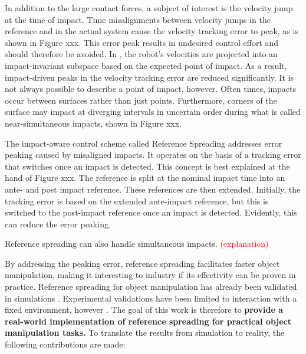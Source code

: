 \documentclass[a4paper, 10pt, conference]{ieeeconf}
\begin{document}
    In addition to the large contact forces, a subject of interest is the velocity jump at the time of impact. Time misalignments between velocity jumps in the reference and in the actual system cause the velocity tracking error to peak\cite{biemondTrackingControlMechanical2012}, as is shown in Figure xxx. This error peak results in undesired control effort and should therefore be avoided. In \cite{yangImpactInvariantControl2021}, the robot's velocities are projected into an impact-invariant subspace based on the expected point of impact. As a result, impact-driven peaks in the velocity tracking error are reduced significantly. It is not always possible to describe a point of impact, however. Often times, impacts occur between surfaces rather than just points. Furthermore, corners of the surface may impact at diverging intervals in uncertain order during what is called near-simultaneous impacts, shown in Figure xxx.

    The impact-aware control scheme called Reference Spreading \cite{sacconSensitivityAnalysisHybrid2014} addresses error peaking caused by misaligned impacts. It operates on the basis of a tracking error that switches once an impact is detected. This concept is best explained at the hand of Figure xxx. The reference is split at the nominal impact time into an ante- and post impact reference. These references are then extended. Initially, the tracking error is based on the extended ante-impact reference, but this is switched to the post-impact reference once an impact is detected. Evidently, this can reduce the error peaking.

    Reference spreading can also handle simultaneous impacts. \cite{vansteenRobotControlSimultaneous2021} \textcolor{red}{(explanation)}

    By addressing the peaking error, reference spreading facilitates faster object manipulation, making it interesting to industry if its effectivity can be proven in practice. Reference spreading for object manipulation has already been validated in simulations \cite{vansteenRobotControlSimultaneous2021,zwartImpactAwareLearningDemonstration2019}. Experimental validations have been limited to interaction with a fixed environment, however \cite{rijnenReferenceSpreadingTracking2020,uitendaalTeachingRobotsInteraction2022}. The goal of this work is therefore to \textbf{provide a real-world implementation of reference spreading for practical object manipulation tasks.} To translate the results from simulation to reality, the following contributions are made:
\end{document}
